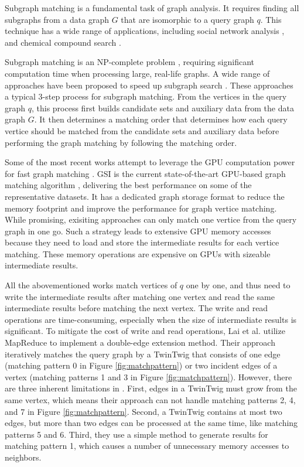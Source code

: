 Subgraph matching is a fundamental task of graph analysis. It requires finding all subgraphs from a data graph $G$ that are isomorphic to a
query graph $q$. This technique has a wide range of applications, including social network analysis \FIXME{\cite{}}, and chemical compound
search \FIXME{\cite{}}.

Subgraph matching is an NP-complete problem \FIXME{\cite{}}, requiring significant computation time when processing large, real-life
graphs. A wide range of approaches have been proposed to speed up subgraph search
\cite{bhattarai2019ceci,guo2020gpu,tran2015fast,shi2020graphpi,bi2016efficient,zeng2020gsi,sun2020subgraph,guo2020exploiting,sun2020rapidmatch,lin2016network}.
These approaches a typical 3-step process for subgraph matching. From the vertices in the query graph $q$, this process first builds
candidate sets and auxiliary data from the data graph $G$. It then determines a matching order that determines how each query vertice
should be matched from the candidate sets and auxiliary data before performing the graph matching by following the matching order.

Some of the most recent works attempt to leverage the GPU computation power for fast graph matching
\cite{lin2016network,guo2020gpu,tran2015fast,zeng2020gsi,guo2020exploiting}. GSI is the current state-of-the-art GPU-based graph matching
algorithm \cite{zeng2020gsi}, delivering the best performance on some of the representative datasets. It has a dedicated graph storage
format to reduce the memory footprint and improve the performance for graph vertice matching. While promising, exisiting approaches can
only match one vertice from the query graph in one go. Such a strategy leads to extensive GPU memory accesses because they need to load and
store the intermediate results for each vertice matching. These memory operations are expensive on GPUs with sizeable intermediate results.



All the abovementioned works match vertices of $q$ one by one, and thus need to write the intermediate results after matching one vertex
and read the same intermediate results before matching the next vertex. The write and read operations are time-consuming, especially when
the size of intermediate results is significant. To mitigate the cost of write and read operations, Lai et al. \cite{lai2015scalable}
utilize MapReduce to implement a double-edge extension method. Their approach iteratively matches the query graph by a TwinTwig that
consists of one edge (matching pattern 0 in Figure \ref{fig:matchpattern}) or two incident edges of a vertex (matching patterns 1 and 3 in
Figure \ref{fig:matchpattern}). However, there are three inherent limitations in \cite{lai2015scalable}. First, edges in a TwinTwig must
grow from the same vertex, which means their approach can not handle matching patterns 2, 4, and 7 in Figure \ref{fig:matchpattern}.
Second, a TwinTwig contains at most two edges, but more than two edges can be processed at the same time, like matching patterns 5 and 6.
Third, they use a simple method to generate results for matching pattern 1, which causes a number of unnecessary memory accesses to
neighbors.

